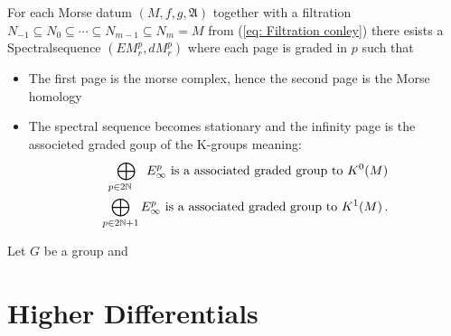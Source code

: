 \begin{theorem}
	For each Morse datum $(M,f,g,\mathfrak{A})$ together with a filtration $N_{-1}\subseteq N_0 \subseteq \cdots \subseteq N_{m-1} \subseteq N_m=M$   from (\ref{eq: Filtration conley}) there esists a Spectralsequence $(EM^p_r,dM^p_r)$ where each page is graded in $p$ such that
	\begin{itemize}
		\item The first page is the morse complex, hence the second page is the Morse homology
		\item The spectral sequence becomes stationary and the infinity page is the associeted graded goup of the K-groups meaning:
		\begin{align*}
			\bigoplus_{p\in 2\mathbb{N}\phantom{+1}} E_\infty ^p \text{ is a associated graded group to }K^0(M) \\
			\bigoplus_{p\in 2\mathbb{N}+1} E_\infty ^p \text{ is a associated graded group to }K^1(M)\,.
		\end{align*}
	\end{itemize}
	\end{theorem}
\begin{remark}
	Let $G$ be a group and 
\end{remark}




\section{Higher Differentials}


